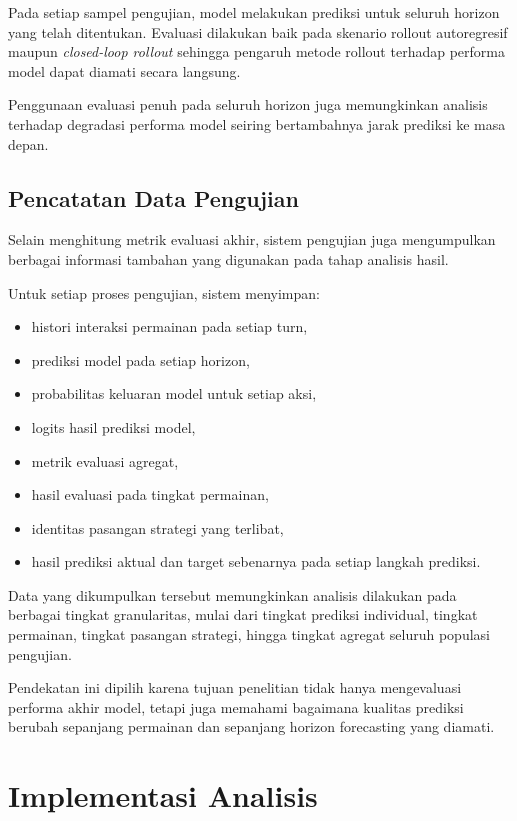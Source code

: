 Pada setiap sampel pengujian, model melakukan prediksi untuk seluruh horizon yang telah ditentukan. Evaluasi dilakukan baik pada skenario rollout autoregresif maupun \textit{closed-loop rollout} sehingga pengaruh metode rollout terhadap performa model dapat diamati secara langsung.

Penggunaan evaluasi penuh pada seluruh horizon juga memungkinkan analisis terhadap degradasi performa model seiring bertambahnya jarak prediksi ke masa depan.

\subsection{Pencatatan Data Pengujian}

Selain menghitung metrik evaluasi akhir, sistem pengujian juga mengumpulkan berbagai informasi tambahan yang digunakan pada tahap analisis hasil.

Untuk setiap proses pengujian, sistem menyimpan:

\begin{itemize}
\item histori interaksi permainan pada setiap turn,
\item prediksi model pada setiap horizon,
\item probabilitas keluaran model untuk setiap aksi,
\item logits hasil prediksi model,
\item metrik evaluasi agregat,
\item hasil evaluasi pada tingkat permainan,
\item identitas pasangan strategi yang terlibat,
\item hasil prediksi aktual dan target sebenarnya pada setiap langkah prediksi.
\end{itemize}

Data yang dikumpulkan tersebut memungkinkan analisis dilakukan pada berbagai tingkat granularitas, mulai dari tingkat prediksi individual, tingkat permainan, tingkat pasangan strategi, hingga tingkat agregat seluruh populasi pengujian.

Pendekatan ini dipilih karena tujuan penelitian tidak hanya mengevaluasi performa akhir model, tetapi juga memahami bagaimana kualitas prediksi berubah sepanjang permainan dan sepanjang horizon forecasting yang diamati.


\section{Implementasi Analisis}

